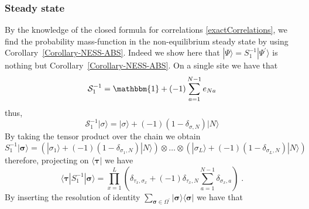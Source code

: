 \documentclass[10pt]{article}
\numberwithin{equation}{section}
\numberwithin{equation}{subsection}
\newcommand{\dt}{\;.}
\begin{document}
\subsubsection{Steady state}\label{appB}
By the knowledge of the closed formula for correlations \eqref{exactCorrelations}, we find the probability mass-function in the non-equilibrium steady state by using Corollary~\ref{Corollary-NESS-ABS}. Indeed we show here that 
$|\Psi\rangle=S_{1}^{-1}|\Psi^{'}\rangle$ is nothing but Corollary~\ref{Corollary-NESS-ABS}.
On a single site we have that 
\begin{equation}\label{S1-L1}
	\mathcal{S}_{1}^{-1}=\mathbbm{1}+(-1)\sum_{a=1}^{N-1}e_{Na}
\end{equation}
thus,
\begin{equation}
	\mathcal{S}_{1}^{-1}|\sigma\rangle=|\sigma\rangle+(-1)(1-\delta_{\sigma,N})|N\rangle
\end{equation}
By taking the tensor product over the chain we obtain 
\begin{equation}
	S_{1}^{-1}|\bm{\sigma}\rangle=\left(|\sigma_{1}\rangle+(-1)(1-\delta_{\sigma_{1},N})|N\rangle\right)\otimes \ldots \otimes \left(|\sigma_{L}\rangle+(-1)(1-\delta_{\sigma_{L},N})|N\rangle\right)
\end{equation}
therefore, projecting on $\langle \bm{\tau}|$ we have
\begin{equation}\label{Tensor-S1}
	\langle \bm{\tau}|	S_{1}^{-1}|\bm{\sigma}\rangle=\prod_{x=1}^{L}\left(\delta_{\tau_{x},\sigma_{x}}+(-1)\delta_{\tau_{x},N}\sum_{a=1}^{N-1}\delta_{\sigma_{x},a}\right)\dt
\end{equation}
	By inserting the resolution of identity $\sum_{\bm{\sigma}\in \Omega^{'}} |\bm{\sigma}\rangle\langle\bm{\sigma}|$ we have that 
\end{document}
